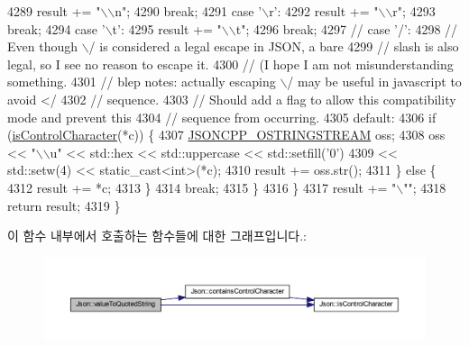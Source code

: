 \begin{DoxyCode}
4289       result += \textcolor{stringliteral}{"\(\backslash\)\(\backslash\)n"};
4290       \textcolor{keywordflow}{break};
4291     \textcolor{keywordflow}{case} \textcolor{charliteral}{'\(\backslash\)r'}:
4292       result += \textcolor{stringliteral}{"\(\backslash\)\(\backslash\)r"};
4293       \textcolor{keywordflow}{break};
4294     \textcolor{keywordflow}{case} \textcolor{charliteral}{'\(\backslash\)t'}:
4295       result += \textcolor{stringliteral}{"\(\backslash\)\(\backslash\)t"};
4296       \textcolor{keywordflow}{break};
4297     \textcolor{comment}{// case '/':}
4298     \textcolor{comment}{// Even though \(\backslash\)/ is considered a legal escape in JSON, a bare}
4299     \textcolor{comment}{// slash is also legal, so I see no reason to escape it.}
4300     \textcolor{comment}{// (I hope I am not misunderstanding something.}
4301     \textcolor{comment}{// blep notes: actually escaping \(\backslash\)/ may be useful in javascript to avoid </}
4302     \textcolor{comment}{// sequence.}
4303     \textcolor{comment}{// Should add a flag to allow this compatibility mode and prevent this}
4304     \textcolor{comment}{// sequence from occurring.}
4305     \textcolor{keywordflow}{default}:
4306       \textcolor{keywordflow}{if} (\hyperlink{namespace_json_a0381e631737f51331065a388f4f59197}{isControlCharacter}(*c)) \{
4307         \hyperlink{json-forwards_8h_a1d06ac2ca63c8c521f41231dfda0e6b3}{JSONCPP\_OSTRINGSTREAM} oss;
4308         oss << \textcolor{stringliteral}{"\(\backslash\)\(\backslash\)u"} << std::hex << std::uppercase << std::setfill(\textcolor{charliteral}{'0'})
4309             << std::setw(4) << \textcolor{keyword}{static\_cast<}\textcolor{keywordtype}{int}\textcolor{keyword}{>}(*c);
4310         result += oss.str();
4311       \} \textcolor{keywordflow}{else} \{
4312         result += *c;
4313       \}
4314       \textcolor{keywordflow}{break};
4315     \}
4316   \}
4317   result += \textcolor{stringliteral}{"\(\backslash\)""};
4318   \textcolor{keywordflow}{return} result;
4319 \}
\end{DoxyCode}
이 함수 내부에서 호출하는 함수들에 대한 그래프입니다.\+:\nopagebreak
\begin{figure}[H]
\begin{center}
\leavevmode
\includegraphics[width=350pt]{namespace_json_aaf777a6923bcb4cf63a2729973fe5315_cgraph}
\end{center}
\end{figure}
